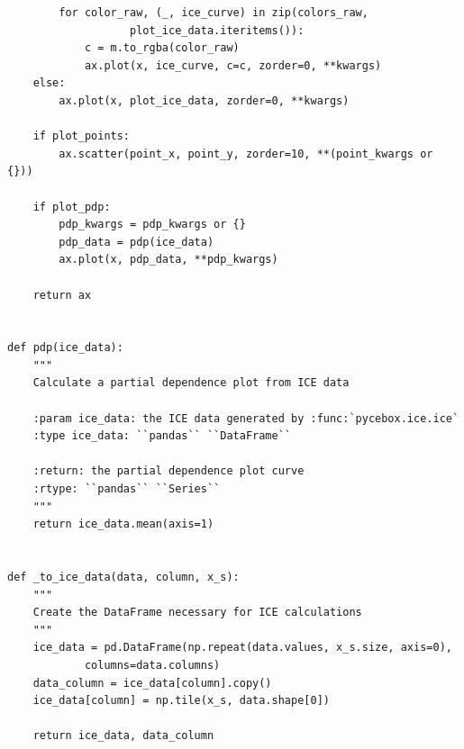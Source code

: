 \documentclass{article}
\begin{document}
\begin{lstlisting}
        for color_raw, (_, ice_curve) in zip(colors_raw, 
                   plot_ice_data.iteritems()):
            c = m.to_rgba(color_raw)
            ax.plot(x, ice_curve, c=c, zorder=0, **kwargs)
    else:
        ax.plot(x, plot_ice_data, zorder=0, **kwargs)

    if plot_points:
        ax.scatter(point_x, point_y, zorder=10, **(point_kwargs or {}))

    if plot_pdp:
        pdp_kwargs = pdp_kwargs or {}
        pdp_data = pdp(ice_data)
        ax.plot(x, pdp_data, **pdp_kwargs)

    return ax


def pdp(ice_data):
    """
    Calculate a partial dependence plot from ICE data

    :param ice_data: the ICE data generated by :func:`pycebox.ice.ice`
    :type ice_data: ``pandas`` ``DataFrame``

    :return: the partial dependence plot curve
    :rtype: ``pandas`` ``Series``
    """
    return ice_data.mean(axis=1)


def _to_ice_data(data, column, x_s):
    """
    Create the DataFrame necessary for ICE calculations
    """
    ice_data = pd.DataFrame(np.repeat(data.values, x_s.size, axis=0), 
            columns=data.columns)
    data_column = ice_data[column].copy()
    ice_data[column] = np.tile(x_s, data.shape[0])

    return ice_data, data_column
\end{lstlisting}
\end{document}
